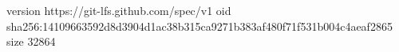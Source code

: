version https://git-lfs.github.com/spec/v1
oid sha256:14109663592d8d3904d1ac38b315ca9271b383af480f71f531b004c4aeaf2865
size 32864
